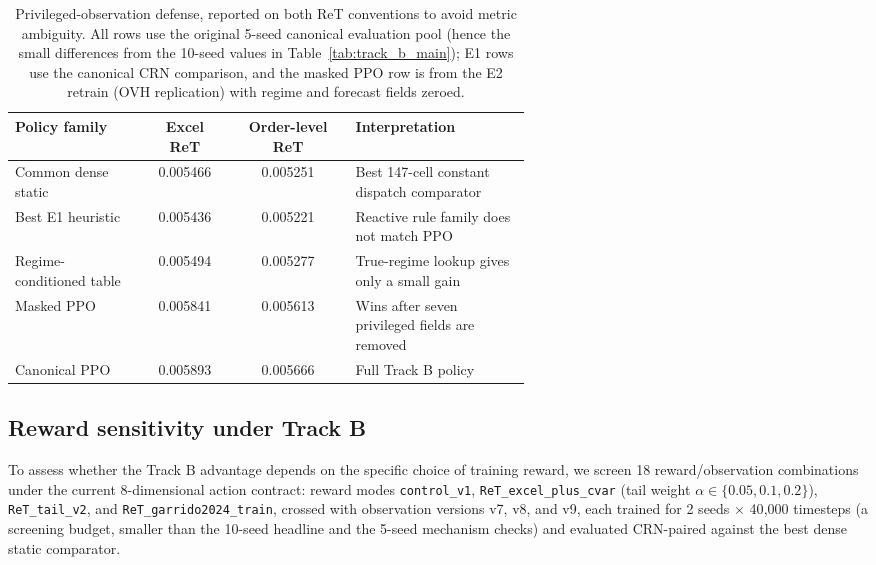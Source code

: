 \begin{table}[htbp]
\centering
\caption{Privileged-observation defense, reported on both ReT conventions
to avoid metric ambiguity. All rows use the original 5-seed canonical
evaluation pool (hence the small differences from the 10-seed values in
Table~\ref{tab:track_b_main}); E1 rows use the canonical CRN comparison,
and the masked PPO row is from the E2 retrain (OVH replication) with
regime and forecast fields zeroed.}
\label{tab:privileged_defense}
\footnotesize
\setlength{\tabcolsep}{3.0pt}
\begin{tabular}{p{0.26\linewidth}cc p{0.34\linewidth}}
\toprule
Policy family & Excel ReT & Order-level ReT & Interpretation \\
\midrule
Common dense static & 0.005466 & 0.005251 & Best 147-cell constant dispatch comparator \\
Best E1 heuristic & 0.005436 & 0.005221 & Reactive rule family does not match PPO \\
Regime-conditioned table & 0.005494 & 0.005277 & True-regime lookup gives only a small gain \\
Masked PPO & 0.005841 & 0.005613 & Wins after seven privileged fields are removed \\
Canonical PPO & 0.005893 & 0.005666 & Full Track B policy \\
\bottomrule
\end{tabular}
\end{table}

\hypertarget{46-reward-sweep}{%
\subsection{Reward sensitivity under Track B}\label{46-reward-sweep}}

To assess whether the Track B advantage depends on the specific choice of
training reward, we screen 18 reward/observation combinations under the
current 8-dimensional action contract: reward modes \texttt{control\_v1},
\texttt{ReT\_excel\_plus\_cvar} (tail weight $\alpha \in \{0.05, 0.1,
0.2\}$), \texttt{ReT\_tail\_v2}, and \texttt{ReT\_garrido2024\_train},
crossed with observation versions v7, v8, and v9, each trained for
2 seeds $\times$ 40{,}000 timesteps (a screening budget, smaller than the
10-seed headline and the 5-seed mechanism checks) and evaluated
CRN-paired against the best dense static comparator.

